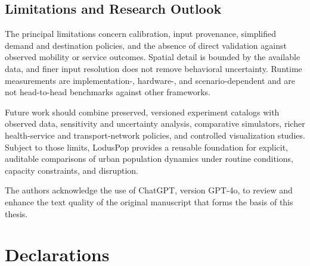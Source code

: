 \documentclass[pdflatex,sn-mathphys-num]{sn-jnl}%
\theoremstyle{thmstyleone}%
\theoremstyle{thmstyletwo}%
\theoremstyle{thmstylethree}%
\begin{document}
\subsection{Limitations and Research Outlook}

The principal limitations concern calibration, input provenance, simplified demand and destination policies, and the absence of direct validation against observed mobility or service outcomes. Spatial detail is bounded by the available data, and finer input resolution does not remove behavioral uncertainty. Runtime measurements are implementation-, hardware-, and scenario-dependent and are not head-to-head benchmarks against other frameworks.

Future work should combine preserved, versioned experiment catalogs with observed data, sensitivity and uncertainty analysis, comparative simulators, richer health-service and transport-network policies, and controlled visualization studies. Subject to those limits, LodusPop provides a reusable foundation for explicit, auditable comparisons of urban population dynamics under routine conditions, capacity constraints, and disruption.



\backmatter

The authors acknowledge the use of ChatGPT, version GPT-4o, to review and enhance the text quality of the original manuscript that forms the basis of this thesis.
    
\section*{Declarations}
\end{document}
